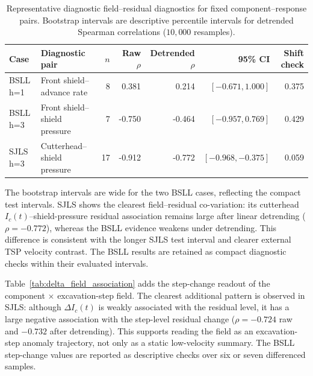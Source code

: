 \begin{table}[htbp]
\centering
\caption{Representative diagnostic field--residual diagnostics for fixed
component--response pairs. Bootstrap intervals are descriptive percentile
intervals for detrended Spearman correlations ($10{,}000$ resamples).}
\label{tab:primary_diagnostic}
\scriptsize
\setlength{\tabcolsep}{3pt}
\begin{tabular}{llrrrrr}
\toprule
Case & Diagnostic pair & $n$ & Raw $\rho$ & Detrended $\rho$ & 95\% CI & Shift check \\
\midrule
BSLL h=1 & Front shield--advance rate & 8 & 0.381 & 0.214 & $[-0.671, 1.000]$ & 0.375 \\
BSLL h=3 & Front shield--shield pressure & 7 & -0.750 & -0.464 & $[-0.957, 0.769]$ & 0.429 \\
SJLS h=3 & Cutterhead--shield pressure & 17 & -0.912 & -0.772 & $[-0.968, -0.375]$ & 0.059 \\
\bottomrule
\end{tabular}
\end{table}

The bootstrap intervals are wide for the two BSLL cases, reflecting the compact
test intervals. SJLS shows the clearest field--residual co-variation: its
cutterhead $I_c(t)$--shield-pressure residual association remains large after
linear detrending ($\rho=-0.772$), whereas the BSLL evidence weakens under
detrending. This difference is consistent with the longer SJLS test interval
and clearer external TSP velocity contrast. The BSLL results are retained as
compact diagnostic checks within their evaluated intervals.

Table~\ref{tab:delta_field_association} adds the step-change readout of the
component $\times$ excavation-step field. The clearest additional pattern is
observed in SJLS: although $\Delta I_c(t)$ is weakly associated with the
residual level, it has a large negative association with the step-level residual change
($\rho=-0.724$ raw and $-0.732$ after detrending). This supports reading the
field as an excavation-step anomaly trajectory, not only as a static
low-velocity summary. The BSLL step-change values are reported as descriptive
checks over six or seven differenced samples.

